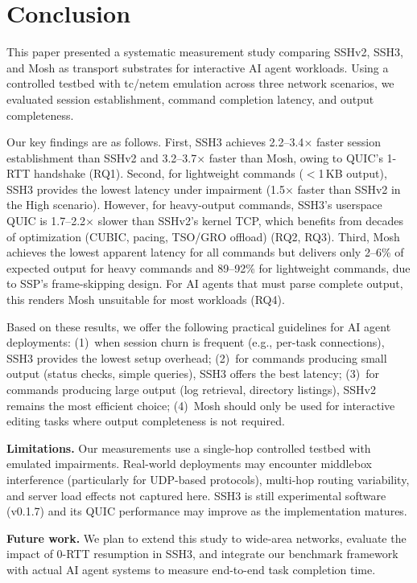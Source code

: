 \section{Conclusion}
\label{sec:conclusion}

This paper presented a systematic measurement study comparing SSHv2, SSH3, and Mosh as transport substrates for interactive AI agent workloads. Using a controlled testbed with tc/netem emulation across three network scenarios, we evaluated session establishment, command completion latency, and output completeness.

Our key findings are as follows. First, SSH3 achieves 2.2--3.4$\times$ faster session establishment than SSHv2 and 3.2--3.7$\times$ faster than Mosh, owing to QUIC's 1-RTT handshake (RQ1). Second, for lightweight commands ($<$1\,KB output), SSH3 provides the lowest latency under impairment (1.5$\times$ faster than SSHv2 in the High scenario). However, for heavy-output commands, SSH3's userspace QUIC is 1.7--2.2$\times$ slower than SSHv2's kernel TCP, which benefits from decades of optimization (CUBIC, pacing, TSO/GRO offload) (RQ2, RQ3). Third, Mosh achieves the lowest apparent latency for all commands but delivers only 2--6\% of expected output for heavy commands and 89--92\% for lightweight commands, due to SSP's frame-skipping design. For AI agents that must parse complete output, this renders Mosh unsuitable for most workloads (RQ4).

Based on these results, we offer the following practical guidelines for AI agent deployments: (1)~when session churn is frequent (e.g., per-task connections), SSH3 provides the lowest setup overhead; (2)~for commands producing small output (status checks, simple queries), SSH3 offers the best latency; (3)~for commands producing large output (log retrieval, directory listings), SSHv2 remains the most efficient choice; (4)~Mosh should only be used for interactive editing tasks where output completeness is not required.

\textbf{Limitations.} Our measurements use a single-hop controlled testbed with emulated impairments. Real-world deployments may encounter middlebox interference (particularly for UDP-based protocols), multi-hop routing variability, and server load effects not captured here. SSH3 is still experimental software (v0.1.7) and its QUIC performance may improve as the implementation matures.

\textbf{Future work.} We plan to extend this study to wide-area networks, evaluate the impact of 0-RTT resumption in SSH3, and integrate our benchmark framework with actual AI agent systems to measure end-to-end task completion time.
